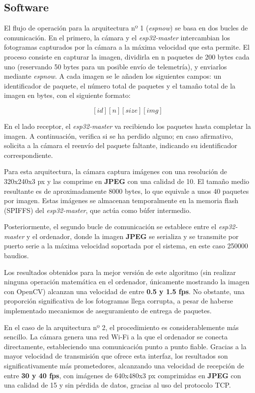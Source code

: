       \subsection{Software}



El flujo de operación para la arquitectura nº 1 (\textit{espnow}) se basa en dos bucles de comunicación. En el primero, la cámara y el \textit{esp32-master} intercambian los fotogramas capturados por la cámara a la máxima velocidad que esta permite. El proceso consiste en capturar la imagen, dividirla en n paquetes de 200 bytes cada uno (reservando 50 bytes para un posible envío de telemetría), y enviarlos mediante \textit{espnow}. A cada imagen se le añaden los siguientes campos: un identificador de paquete, el número total de paquetes y el tamaño total de la imagen en bytes, con el siguiente formato:

\textbf{$$[id][n][size][img]$$}

En el lado receptor, el \textit{esp32-master} va recibiendo los paquetes hasta completar la imagen. A continuación, verifica si se ha perdido alguno; en caso afirmativo, solicita a la cámara el reenvío del paquete faltante, indicando su identificador correspondiente.

Para esta arquitectura, la cámara captura imágenes con una resolución de 320x240x3 px y las comprime en \textbf{JPEG} con una calidad de 10. El tamaño medio resultante es de aproximadamente 8000 bytes, lo que equivale a unos 40 paquetes por imagen. Estas imágenes se almacenan temporalmente en la memoria flash (SPIFFS) del \textit{esp32-master}, que actúa como búfer intermedio.

Posteriormente, el segundo bucle de comunicación se establece entre el \textit{esp32-master} y el ordenador, donde la imagen \textbf{JPEG} se serializa y se transmite por puerto serie a la máxima velocidad soportada por el sistema, en este caso 250000 baudios.

Los resultados obtenidos para la mejor versión de este algoritmo (sin realizar ninguna operación matemática en el ordenador, únicamente mostrando la imagen con OpenCV) alcanzan una velocidad de entre \textbf{0.5 y 1.5 fps}. No obstante, una proporción significativa de los fotogramas llega corrupta, a pesar de haberse implementado mecanismos de aseguramiento de entrega de paquetes.

En el caso de la arquitectura nº 2, el procedimiento es considerablemente más sencillo. La cámara genera una red Wi-Fi a la que el ordenador se conecta directamente, estableciendo una comunicación punto a punto fiable. Gracias a la mayor velocidad de transmisión que ofrece esta interfaz, los resultados son significativamente más prometedores, alcanzando una velocidad de recepción de entre \textbf{30 y 40 fps}, con imágenes de 640x480x3 px comprimidas en \textbf{JPEG} con una calidad de 15 y sin pérdida de datos, gracias al uso del protocolo TCP.

